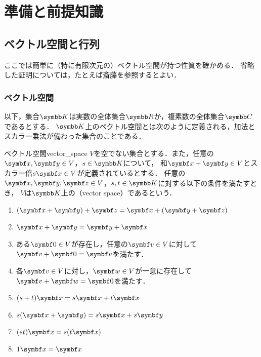 \documentclass[../../main]{subfiles}
\begin{document}
\chapter{準備と前提知識}
\label{chapter:preliminary}

\section{ベクトル空間と行列}

ここでは簡単に（特に有限次元の）ベクトル空間が持つ性質を確かめる．
省略した証明については，たとえば斎藤\cite{saito2020}を参照するとよい．

\subsection{ベクトル空間}

以下，集合\(\numset{K}\)は実数の全体集合\(\numset{R}\)か，複素数の全体集合\(\numset{C}\)であるとする．
\(\numset{K}\)上のベクトル空間とは次のように定義される，加法とスカラー乗法が備わった集合のことである．

\begin{definition}{ベクトル空間}{vector_space}
  \(V\)を空でない集合とする．また，任意の\(\vect{x},\vect{y}\in V\)，\(s\in\numset{K}\)について，
  和\(\vect{x}+\vect{y}\in V\)とスカラー倍\(s\vect{x}\in V\)が定義されているとする．
  任意の\(\vect{x},\vect{y},\vect{z}\in V\)，\(s,t\in\numset{K}\)に対する以下の条件を満たすとき，
  \(V\)は\(\numset{K}\)上の（vector space）であるという．

  \begin{enumerate}
    \item \((\vect{x}+\vect{y})+\vect{z}=\vect{x}+(\vect{y}+\vect{z})\)
    \item \(\vect{x}+\vect{y}=\vect{y}+\vect{x}\)
    \item ある\(\zvec\in V\)が存在し，任意の\(\vect{v}\in V\)に対して\(\vect{v}+\zvec=\vect{v}\)を満たす．
    \item 各\(\vect{v}\in V\)に対し，\(\vect{w}\in V\)が一意に存在して\(\vect{v}+\vect{w}=\zvec\)を満たす．
    \item \((s+t)\vect{x}=s\vect{x}+t\vect{x}\)
    \item \(s(\vect{x}+\vect{y})=s\vect{x}+s\vect{y}\)
    \item \((st)\vect{x}=s(t\vect{x})\)
    \item \(1\vect{x}=\vect{x}\)
  \end{enumerate}
\end{definition}
\end{document}
